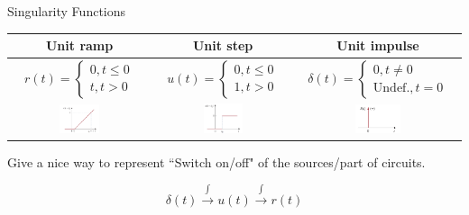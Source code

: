 \documentclass{beamer}
\begin{document}

\begin{frame}{Singularity Functions}

\begin{table}[]
    \centering
    \begin{small}
        
    \begin{tabular}{ccc}
        \toprule
        \textbf{Unit ramp} & \textbf{Unit step} & \textbf{Unit impulse} \\
         \midrule
         $$ r(t)=
        \begin{cases}
        0, t \leq 0\\
        t, t>0
        \end{cases} $$
         &
         $$ u(t)=
        \begin{cases}
        0, t \leq 0\\
        1, t>0
        \end{cases} $$
         &
         $$\delta(t)=
        \begin{cases}
        0, t\neq 0\\
        \text{Undef.}, t=0
        \end{cases}$$
         \\
         \includegraphics[width=0.3\textwidth]{img_1order/5_rampt.png}
         &
        \includegraphics[width=0.3\textwidth]{img_1order/6_ut.png}
         &
         \includegraphics[width=0.29\textwidth]{img_1order/4_deltat.png}
         \\
         \bottomrule
    \end{tabular}
    \end{small}
\end{table}

Give a nice way to represent ``Switch on/off" of the sources/part of circuits.

$$\delta(t) \stackrel{\int}{\longrightarrow} u(t) \stackrel{\int}{\longrightarrow} r(t)$$


\end{frame}
\end{document}
